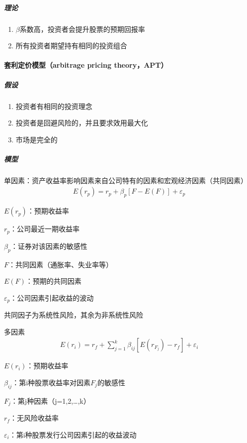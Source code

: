 \documentclass[12pt]{book}
\begin{document}
\subparagraph{理论}

\begin{enumerate}[(1)]
  \item $\beta$系数高，投资者会提升股票的预期回报率
  \item 所有投资者期望持有相同的投资组合
\end{enumerate}






\paragraph{套利定价模型（arbitrage pricing theory，APT）}

\subparagraph{假设}	
\begin{enumerate}[(1)]
  \item 投资者有相同的投资理念
  \item 投资者是回避风险的，并且要求效用最大化
  \item 市场是完全的
\end{enumerate}

\subparagraph{模型}

单因素：资产收益率影响因素来自公司特有的因素和宏观经济因素（共同因素）
\begin{gather*}
  E(r_p )=r_p+\beta_p [F-E(F)]+\varepsilon_p
\end{gather*}
\par $E(r_p)$：预期收益率
\par $r_p$：公司最近一期收益率
\par $\beta_p$：证券对该因素的敏感性
\par $F$：共同因素（通胀率、失业率等）
\par $E(F)$：预期的共同因素
\par $\varepsilon_p$：公司因素引起收益的波动
\par 共同因子为系统性风险，其余为非系统性风险


多因素
\begin{gather*}
  E(r_i) = r_f + \sum_{j=1}^{k}{\beta_{ij} [E(r_{F_j})- r_f]} +\varepsilon_i
\end{gather*}
\par $E(r_i)$：预期收益率
\par $\beta_{ij}$：第i种股票收益率对因素$F_j$的敏感性
\par $F_j$：第j种因素（j=1,2,…,k）
\par $r_f$：无风险收益率
\par $\varepsilon_i$：第i种股票发行公司因素引起的收益波动
\end{document}
